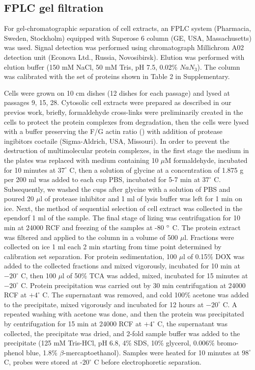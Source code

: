 \documentclass[alpha-refs]{wiley-article}
\begin{document}
\subsection{FPLC gel filtration}

For gel-chromatographic separation of cell extracts, an FPLC system (Pharmacia, Sweden, Stockholm) equipped with Superose 6 column (GE, USA, Massachusetts) was used.
Signal detection was performed using chromatograph Millichrom A02 detection unit (Econova Ltd., Russia, Novosibirsk).
Elution was performed with elution buffer (150 mM NaCl, 50 mM Tris, pH 7.5, 0.02\% $NaN_3$).
The column was calibrated with the set of proteins shown in Table 2 in Supplementary.

Cells were grown on 10 cm dishes (12 dishes for each passage) and lysed at passages 9, 15, 28.
Cytosolic cell extracts were prepared as described in our previos work, briefly, formaldehyde cross-links were preliminarily created in the cells to protect the protein complexes from degradation, then the cells were lysed with a buffer preserving the F/G actin ratio (\cite{bobkov2017effect}) with addition of protease ingibitors coctaile (Sigma-Aldrich, USA, Missouri).
In order to prevent the destruction of multimolecular protein complexes, in the first stage the medium in the plates was replaced with medium containing 10 $\mu$M formaldehyde, incubated for 10 minutes at $37^{\circ}$ C, then a solution of glycine at a concentration of 1.875 g per 200 ml was added to each cup PBS, incubated for 5-7 min at  $37^{\circ}$  C.
Subsequently, we washed the cups after glycine with a solution of PBS and poured 20 $\mu$l of protease inhibitor and 1 ml of lysis buffer was left for 1 min on ice.
Next, the method of sequential selection of cell extract was collected in the ependorf 1 ml of the sample.
The final stage of lizing was centrifugation for 10 min at 24000 RCF and freezing of the samples at -80 $\degree$ C.
The protein extract was filtered and applied to the column in a volume of 500 $\mu$l.
Fractions were collected on ice 1 ml each 2 min starting from time point determined by calibration set separation.
For protein sedimentation, 100 $\mu$l of 0.15\% DOX was added to the collected fractions and mixed vigorously, incubated for 10 min at  $-20^{\circ}$ C, then 100 $\mu$l of 50\% TCA was added, mixed, incubated for 15 minutes at  $-20^{\circ}$ C.
 Protein precipitation was carried out by 30 min centrifugation at 24000 RCF at $+4^{\circ}$ C.
The supernatant was removed, and cold 100\% acetone was added to the precipitate, mixed vigorously and incubated for 12 hours at $-20^{\circ}$ C.
A repeated washing with acetone was done, and then the protein was precipitated by centrifugation for 15 min at 24000 RCF at $+4^{\circ}$ C, the supernatant was collected, the precipitate was dried, and 2-fold sample buffer was added to the precipitate (125 mM Tris-HCl, pH 6.8, 4\% SDS, 10\% glycerol, 0.006\% bromo-phenol blue, 1.8\% $\beta$-mercaptoethanol).
Samples were heated for 10 minutes at $98^{\circ}$ C, probes were stored at -$20^{\circ}$ C before electrophoretic separation.
\end{document}
